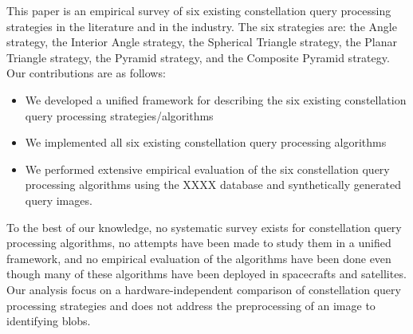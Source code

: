 This paper is an empirical survey of six existing constellation query processing
strategies in the literature and in the industry. The six strategies are: the
Angle strategy, the Interior Angle strategy, the Spherical Triangle strategy,
the Planar Triangle strategy, the Pyramid strategy, and the Composite
Pyramid strategy. Our contributions are as follows:
\begin{itemize}
\item We developed a unified framework for describing the six existing
constellation query processing strategies/algorithms
\item We implemented all six existing constellation query processing algorithms
\item We performed extensive empirical evaluation of the six constellation query processing
algorithms using the XXXX database and synthetically generated query images.  
\end{itemize} 
To the best of our knowledge, no systematic survey exists for constellation
query processing algorithms, no attempts have been made to study them in a
unified framework, and no empirical evaluation of the algorithms have been done
even though many of these algorithms have been deployed in spacecrafts and
satellites. Our analysis focus on a hardware-independent comparison of
constellation query processing strategies and does not address the preprocessing
of an image to identifying blobs.

